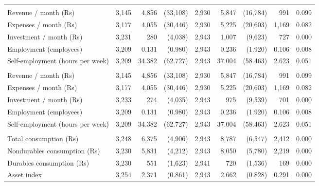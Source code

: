 \documentclass{report}
\begin{document}
\begin{table}[H]
{\begin{tabular}{lrrrrrrrr}
\addlinespace[0.3em]
\multicolumn{9}{l}{\textbf{Businesses}}\\
\hspace{1em}Revenue / month (Rs) & 3,145 & 4,856 & (33,108) & 2,930 & 5,847 & (16,784) & 991 & \vphantom{1}0.099\\
\hspace{1em}Expenses / month (Rs) & 3,177 & 4,055 & (30,446) & 2,930 & 5,225 & (20,603) & 1,169 & \vphantom{1}0.082\\
\hspace{1em}Investment / month (Rs) & 3,231 & 280 & (4,038) & 2,943 & 1,007 & (9,623) & 727 & 0.000\\
\hspace{1em}Employment (employees) & 3,209 & 0.131 & (0.980) & 2,943 & 0.236 & (1.920) & 0.106 & \vphantom{1}0.008\\
\hspace{1em}Self-employment (hours per week) & 3,209 & 34.382 & (62.727) & 2,943 & 37.004 & (58.463) & 2.623 & \vphantom{1}0.051\\
\addlinespace[0.3em]
\multicolumn{9}{l}{\textbf{Businesses (all households)}}\\
\hspace{1em}Revenue / month (Rs) & 3,145 & 4,856 & (33,108) & 2,930 & 5,847 & (16,784) & 991 & 0.099\\
\hspace{1em}Expenses / month (Rs) & 3,177 & 4,055 & (30,446) & 2,930 & 5,225 & (20,603) & 1,169 & 0.082\\
\hspace{1em}Investment / month (Rs) & 3,233 & 274 & (4,035) & 2,943 & 975 & (9,539) & 701 & 0.000\\
\hspace{1em}Employment (employees) & 3,209 & 0.131 & (0.980) & 2,943 & 0.236 & (1.920) & 0.106 & 0.008\\
\hspace{1em}Self-employment (hours per week) & 3,209 & 34.382 & (62.727) & 2,943 & 37.004 & (58.463) & 2.623 & 0.051\\
\addlinespace[0.3em]
\multicolumn{9}{l}{\textbf{Consumption (per household per month)}}\\
\hspace{1em}Total consumption (Rs) & 3,248 & 6,375 & (4,906) & 2,943 & 8,787 & (6,547) & 2,412 & 0.000\\
\hspace{1em}Nondurables consumption (Rs) & 3,230 & 5,831 & (4,212) & 2,943 & 8,050 & (5,780) & 2,219 & 0.000\\
\hspace{1em}Durables consumption (Rs) & 3,230 & 551 & (1,623) & 2,941 & 720 & (1,536) & 169 & 0.000\\
\hspace{1em}Asset index & 3,254 & 2.371 & (0.861) & 2,943 & 2.662 & (0.828) & 0.291 & 0.000\\
\bottomrule
\end{tabular}}
\end{table}
\end{document}
